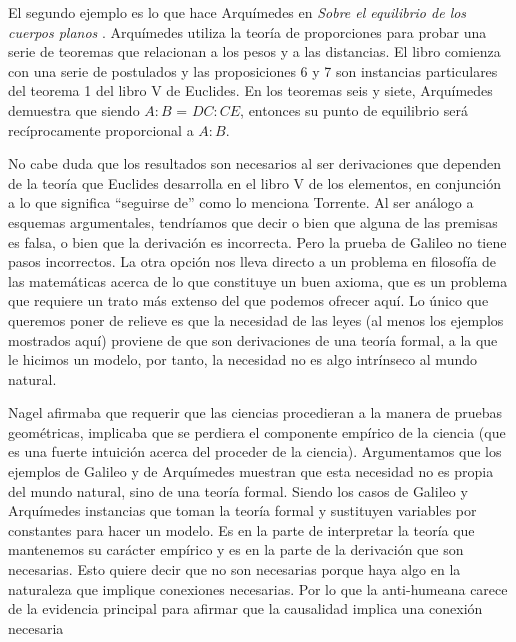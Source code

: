 El segundo ejemplo es lo que hace Arquímedes en \emph{Sobre el equilibrio de los cuerpos planos} \cite{Archimedes1897}. Arquímedes utiliza la teoría de proporciones para probar una serie de teoremas que relacionan a los pesos y a las distancias. El libro comienza con una serie de postulados y las proposiciones 6 y 7 son instancias particulares del teorema 1 del libro V de Euclides. En los teoremas seis y siete, Arquímedes demuestra que siendo $A:B$ = $DC:CE$, entonces su punto de equilibrio será recíprocamente proporcional a $A:B$.

No cabe duda que los resultados son necesarios al ser derivaciones que dependen de la teoría que Euclides desarrolla en el libro V de los elementos, en conjunción a lo que significa ``seguirse de'' como lo menciona Torrente. Al ser análogo a esquemas argumentales, tendríamos que decir o bien que alguna de las premisas es falsa, o bien que la derivación es incorrecta. Pero la prueba de Galileo no tiene pasos incorrectos. La otra opción nos lleva directo a un problema en filosofía de las matemáticas acerca de lo que constituye un buen axioma, que es un problema que requiere un trato más extenso del que podemos ofrecer aquí. Lo único que queremos poner de relieve es que la necesidad de las leyes (al menos los ejemplos mostrados aquí) proviene de que son derivaciones de una teoría formal, a la que le hicimos un modelo, por tanto, la necesidad no es algo intrínseco al mundo natural.


Nagel afirmaba que requerir que las ciencias procedieran a la manera de pruebas geométricas, implicaba que se perdiera el componente empírico de la ciencia (que es una fuerte intuición acerca del proceder de la ciencia). Argumentamos que los ejemplos de Galileo y de Arquímedes muestran que esta necesidad no es propia del mundo natural, sino de una teoría formal. Siendo los casos de Galileo y Arquímedes instancias que toman la teoría formal y  sustituyen variables por constantes para hacer un modelo. Es en la parte de interpretar la teoría que mantenemos su carácter empírico y es en la parte de la derivación que son necesarias. Esto quiere decir que no son necesarias porque haya algo en la naturaleza que implique conexiones necesarias. Por lo que la anti-humeana carece de la evidencia principal para afirmar que la causalidad implica una conexión necesaria

